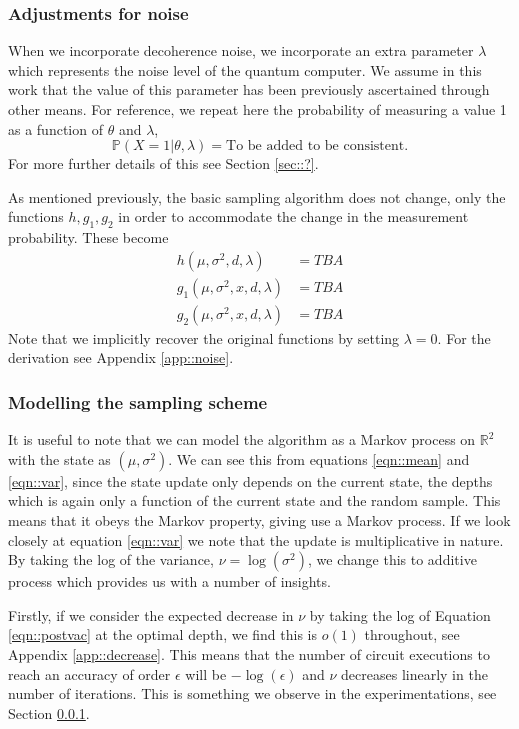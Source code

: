 \subsubsection{Adjustments for noise}
When we incorporate decoherence noise, we incorporate an extra parameter $\lambda$ which represents the noise level of the quantum computer. We assume in this work that the value of this parameter has been previously ascertained through other means. For reference, we repeat here the probability of measuring a value 1 as a function of $\theta$ and $\lambda$,
$$\mathbb{P}(X=1| \theta, \lambda)=\text{To be added to be consistent.}$$
For more further details of this see Section \ref{sec::?}.

As mentioned previously, the basic sampling algorithm does not change, only the functions $h, g_1, g_2$ in order to accommodate the change in the measurement probability. These become
\begin{align}
	h(\mu,\sigma^2,d, \lambda) &= TBA \label{eqn::npostvac}\\
	g_1(\mu,\sigma^2,x,d, \lambda) &= TBA \label{eqn::nmean}\\
	g_2(\mu,\sigma^2,x,d, \lambda) &= TBA \label{eqn::nvar}
\end{align}
Note that we implicitly recover the original functions by setting $ \lambda = 0$.
For the derivation see Appendix \ref{app::noise}.


\subsubsection{Modelling the sampling scheme}\label{sec::model}

It is useful to note that we can model the algorithm as a Markov process on $\mathbb{R}^2$ with the state as $(\mu,\sigma^2)$. We can see this from equations \ref{eqn::mean} and \ref{eqn::var}, since the state update only depends on the current state, the depths which is again only a function of the current state and the random sample. This means that it obeys the Markov property, giving use a Markov process. If we look closely at equation \ref{eqn::var} we note that the update is multiplicative in nature. By taking the log of the variance, $\nu=\log(\sigma^2)$, we change this to additive process which provides us with a number of insights.

Firstly, if we consider the expected decrease in $\nu$ by taking the log of Equation \ref{eqn::postvac} at the optimal depth, we find this is $o(1)$ throughout, see Appendix \ref{app::decrease}. This means that the number of circuit executions to reach an accuracy of order $\epsilon$ will be $-\log(\epsilon)$ and $\nu$ decreases linearly in the number of iterations. This is something we observe in the experimentations, see Section \ref{}.


